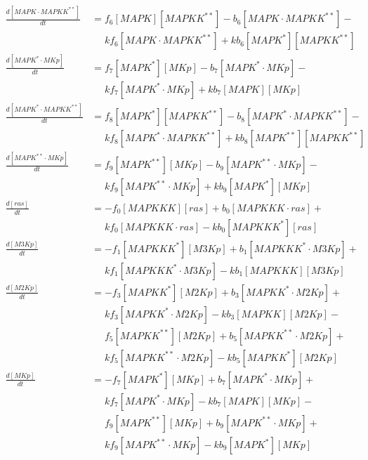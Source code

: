 \begin{equation*}
\begin{align*}
    \frac{d[MAPK\cdot{}MAPKK^{**}]}{dt} &= f_{6}[MAPK][MAPKK^{**}] - b_{6}[MAPK\cdot{}MAPKK^{**}] -\\
    &\phantom{=} kf_{6}[MAPK\cdot{}MAPKK^{**}] + kb_{6}[MAPK^{*}][MAPKK^{**}]\\
    \frac{d[MAPK^{*}\cdot{}MKp]}{dt} &= f_{7}[MAPK^{*}][MKp] - b_{7}[MAPK^{*}\cdot{}MKp] -\\
    &\phantom{=} kf_{7}[MAPK^{*}\cdot{}MKp] + kb_{7}[MAPK][MKp]\\
    \frac{d[MAPK^{*}\cdot{}MAPKK^{**}]}{dt} &= f_{8}[MAPK^{*}][MAPKK^{**}] - b_{8}[MAPK^{*}\cdot{}MAPKK^{**}] -\\
    &\phantom{=} kf_{8}[MAPK^{*}\cdot{}MAPKK^{**}] + kb_{8}[MAPK^{**}][MAPKK^{**}]\\
    \frac{d[MAPK^{**}\cdot{}MKp]}{dt} &= f_{9}[MAPK^{**}][MKp] - b_{9}[MAPK^{**}\cdot{}MKp] -\\
    &\phantom{=} kf_{9}[MAPK^{**}\cdot{}MKp] + kb_{9}[MAPK^{*}][MKp]\\
    \frac{d[ras]}{dt} &= -f_{0}[MAPKKK][ras] + b_{0}[MAPKKK\cdot{}ras] +\\
    &\phantom{=} kf_{0}[MAPKKK\cdot{}ras] - kb_{0}[MAPKKK^{*}][ras]\\
    \frac{d[M3Kp]}{dt} &= -f_{1}[MAPKKK^{*}][M3Kp] + b_{1}[MAPKKK^{*}\cdot{}M3Kp] +\\
    &\phantom{=} kf_{1}[MAPKKK^{*}\cdot{}M3Kp] - kb_{1}[MAPKKK][M3Kp]\\
    \frac{d[M2Kp]}{dt} &= -f_{3}[MAPKK^{*}][M2Kp] + b_{3}[MAPKK^{*}\cdot{}M2Kp] +\\
    &\phantom{=} kf_{3}[MAPKK^{*}\cdot{}M2Kp] - kb_{3}[MAPKK][M2Kp] -\\
    &\phantom{=} f_{5}[MAPKK^{**}][M2Kp] + b_{5}[MAPKK^{**}\cdot{}M2Kp] +\\
    &\phantom{=} kf_{5}[MAPKK^{**}\cdot{}M2Kp] - kb_{5}[MAPKK^{*}][M2Kp]\\
    \frac{d[MKp]}{dt} &= -f_{7}[MAPK^{*}][MKp] + b_{7}[MAPK^{*}\cdot{}MKp] +\\
    &\phantom{=} kf_{7}[MAPK^{*}\cdot{}MKp] - kb_{7}[MAPK][MKp] -\\
    &\phantom{=} f_{9}[MAPK^{**}][MKp] + b_{9}[MAPK^{**}\cdot{}MKp] +\\
    &\phantom{=} kf_{9}[MAPK^{**}\cdot{}MKp] - kb_{9}[MAPK^{*}][MKp]\\
  \end{align*}
\end{equation*}
\normalsize

